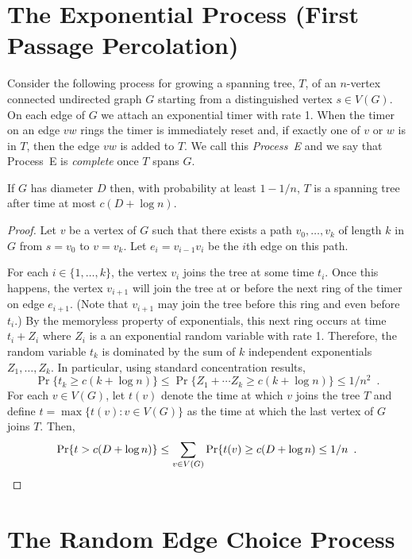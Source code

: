 \documentclass{patmorin}
\begin{document}
\section{The Exponential Process (First Passage Percolation)}

Consider the following process for growing a spanning tree, $T$, of an
$n$-vertex connected undirected graph $G$ starting from a distinguished
vertex $s\in V(G)$.  On each edge of $G$ we attach an exponential timer
with rate 1. When the timer on an edge $vw$ rings the timer is immediately
reset and, if exactly one of $v$ or $w$ is in $T$, then the edge $vw$
is added to $T$.  We call this \emph{Process~E} and we say that Process~E
is \emph{complete} once $T$ spans $G$.

\begin{lem}
  If $G$ has diameter $D$ then, with probability at least $1-1/n$, $T$
  is a spanning tree after time at most $c(D+\log n)$.
\end{lem}


\begin{proof}
  Let $v$ be a vertex of $G$ such that there exists a path
  $v_0,\ldots,v_k$ of length $k$ in $G$ from $s=v_0$ to $v=v_k$.
  Let $e_i=v_{i-1}v_i$ be the $i$th edge on this path.

  For each $i\in\{1,\ldots,k\}$, the vertex $v_i$ joins the tree at some
  time $t_i$.  Once this happens, the vertex $v_{i+1}$ will join the tree
  at or before the next ring of the timer on edge $e_{i+1}$.  (Note that
  $v_{i+1}$ may join the tree before this ring and even before $t_i$.)
  By the memoryless property of exponentials, this next ring occurs at
  time $t_i+Z_i$ where $Z_i$ is a an exponential random variable with
  rate 1.  Therefore, the random variable $t_k$ is dominated by the sum
  of $k$ independent exponentials $Z_1,\ldots,Z_k$.
  In particular, using standard concentration results,
  \[
      \Pr\{t_k\ge c(k+\log n)\} \le \Pr\{Z_1+\cdots Z_k\ge c(k+\log n)\} \le 1/n^2 \enspace .
  \]
  For each $v\in V(G)$, let $t(v)$ denote the time at which $v$ joins
  the tree $T$ and define $t=\max\{t(v):v\in V(G)\}$
  as the time at which the last vertex of $G$ joins 
  $T$.  Then,
  \[
      \Pr\{t> c(D+\log n)\} \le \sum_{v\in V(G)}\Pr\{t(v) \ge c(D+\log n)     
       \le 1/n \enspace . \qedhere
  \]
\end{proof}

\section{The Random Edge Choice Process}
\end{document}
